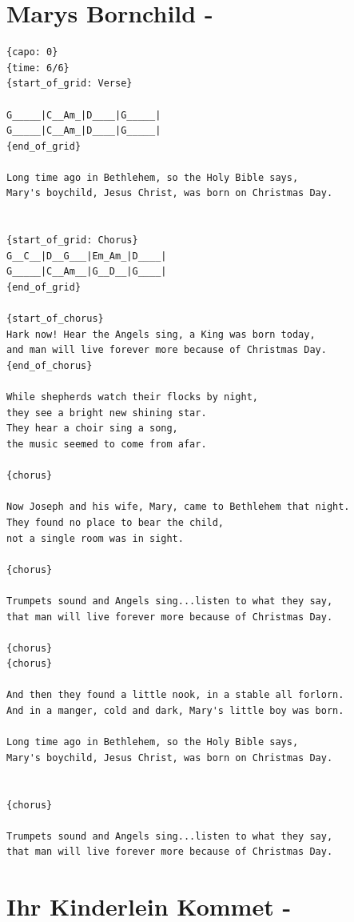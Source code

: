 \documentclass[]{book}
\let\stdsection\section
\renewcommand\section{\clearpage\stdsection}
\begin{document}
\hypertarget{marys-bornchild--}{%
\section{Marys Bornchild -}\label{marys-bornchild--}}

\begin{verbatim}
{capo: 0}
{time: 6/6}
{start_of_grid: Verse}

G_____|C__Am_|D____|G_____|
G_____|C__Am_|D____|G_____|
{end_of_grid}

Long time ago in Bethlehem, so the Holy Bible says,  
Mary's boychild, Jesus Christ, was born on Christmas Day. 


{start_of_grid: Chorus}
G__C__|D__G___|Em_Am_|D____|
G_____|C__Am__|G__D__|G____|
{end_of_grid}

{start_of_chorus}
Hark now! Hear the Angels sing, a King was born today, 
and man will live forever more because of Christmas Day. 
{end_of_chorus}  

While shepherds watch their flocks by night, 
they see a bright new shining star. 
They hear a choir sing a song,  
the music seemed to come from afar.  
  
{chorus} 

Now Joseph and his wife, Mary, came to Bethlehem that night. 
They found no place to bear the child,  
not a single room was in sight.      
  
{chorus}

Trumpets sound and Angels sing...listen to what they say, 
that man will live forever more because of Christmas Day. 

{chorus}
{chorus}
  
And then they found a little nook, in a stable all forlorn. 
And in a manger, cold and dark, Mary's little boy was born.

Long time ago in Bethlehem, so the Holy Bible says,  
Mary's boychild, Jesus Christ, was born on Christmas Day. 

  
{chorus}

Trumpets sound and Angels sing...listen to what they say, 
that man will live forever more because of Christmas Day.
\end{verbatim}

\hypertarget{ihr-kinderlein-kommet--}{%
\section{Ihr Kinderlein Kommet -}\label{ihr-kinderlein-kommet--}}
\end{document}
